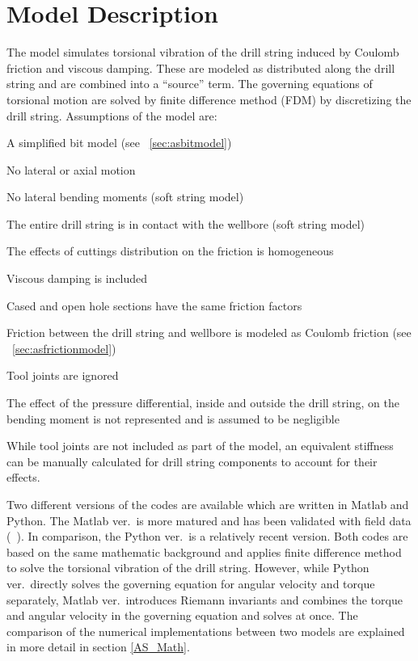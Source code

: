 \section{Model Description}
The model simulates torsional vibration of the drill string induced by Coulomb friction and viscous damping.  These are modeled as distributed along the drill string and are combined into a ``source'' term. The governing equations of torsional motion are solved by finite difference method (FDM) by discretizing the drill string. Assumptions of the model are:
\begin{bulletedlist}
	\item A simplified bit model (see \sectionname~\ref{sec:asbitmodel})
	\item No lateral or axial motion
    \item No lateral bending moments (soft string model)
    \item The entire drill string is in contact with the wellbore (soft string model)
	\item The effects of cuttings distribution on the friction is homogeneous
	\item Viscous damping is included
	\item Cased and open hole sections have the same friction factors
    \item Friction between the drill string and wellbore is modeled as Coulomb friction (see \sectionname~\ref{sec:asfrictionmodel})
    \item Tool joints are ignored
    \item The effect of the pressure differential, inside and outside the drill string, on the bending moment is not represented and is assumed to be negligible
\end{bulletedlist}
While tool joints are not included as part of the model, an equivalent stiffness can be manually calculated for drill string components to account for their effects.

Two different versions of the codes are available which are written in Matlab and Python. The Matlab ver.\ is more matured and has been validated with field data (~\cite{ref:aarsnes2017a}). In comparison, the Python ver.\ is a relatively recent version. Both codes are based on the same mathematic background and applies finite difference method to solve the torsional vibration of the drill string. However, while Python ver.\ directly solves the governing equation for angular velocity and torque separately, Matlab ver.\ introduces Riemann invariants and combines the torque and angular velocity in the governing equation and solves at once. The comparison of the numerical implementations between two models are explained in more detail in section \ref{AS_Math}. 

